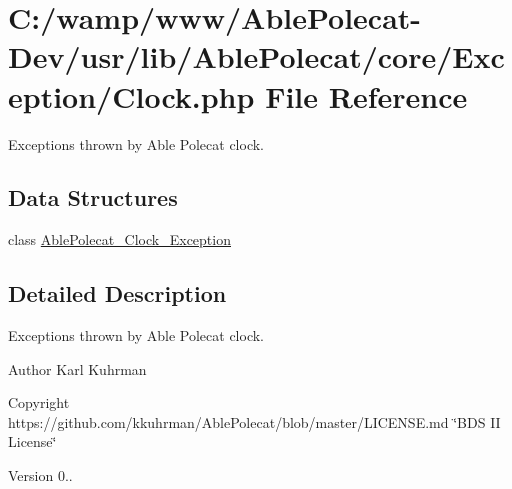 \hypertarget{_exception_2_clock_8php}{}\section{C\+:/wamp/www/\+Able\+Polecat-\/\+Dev/usr/lib/\+Able\+Polecat/core/\+Exception/\+Clock.php File Reference}
\label{_exception_2_clock_8php}


Exceptions thrown by Able Polecat clock.  


\subsection*{Data Structures}
\begin{DoxyCompactItemize}
\item 
class \hyperlink{class_able_polecat___clock___exception}{Able\+Polecat\+\_\+\+Clock\+\_\+\+Exception}
\end{DoxyCompactItemize}


\subsection{Detailed Description}
Exceptions thrown by Able Polecat clock. 

\begin{DoxyAuthor}{Author}
Karl Kuhrman 
\end{DoxyAuthor}
\begin{DoxyCopyright}{Copyright}
https\+://github.com/kkuhrman/\+Able\+Polecat/blob/master/\+L\+I\+C\+E\+N\+S\+E.\+md \char`\"{}\+B\+D\+S I\+I License\char`\"{} 
\end{DoxyCopyright}
\begin{DoxyVersion}{Version}
0.. 
\end{DoxyVersion}
